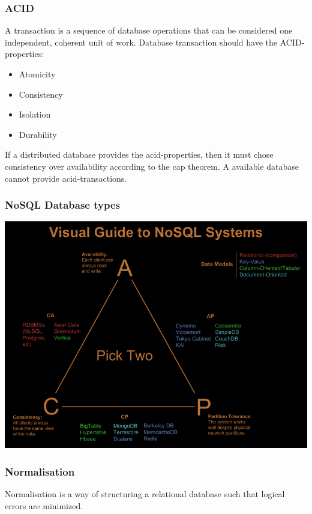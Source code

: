 \subsubsection{ACID}
A transaction is a sequence of database operations that can be considered one independent, coherent unit of work. Database transaction should have the ACID-properties:
\begin{itemize}
    \item Atomicity
    \item Consistency
    \item Isolation
    \item Durability
\end{itemize}

If a distributed database provides the acid-properties, then it must chose consistency over availability according to the cap theorem. A available database cannot provide acid-transactions. 

\subsubsection{NoSQL Database types}
\includegraphics[scale=0.5]{images/cap_choice.png}


\subsubsection{Normalisation}
Normalisation is a way of structuring a relational database such that logical errors are minimized. 

